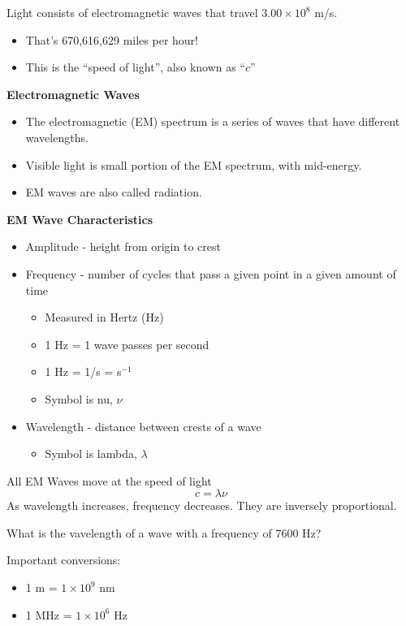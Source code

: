 \documentclass[../hchem.tex]{subfiles}
\begin{document}
Light consists of electromagnetic waves that travel $3.00\times 10^8$ m/s.
\begin{itemize}
    \item That's 670,616,629 miles per hour! 
    \item This is the ``speed of light'', also known as ``$c$''
\end{itemize}

\textbf{Electromagnetic Waves}
\begin{itemize}
    \item The electromagnetic (EM) spectrum is a series of waves that have different wavelengths.
    \item Visible light is small portion of the EM spectrum, with mid-energy.
    \item EM waves are also called radiation.
\end{itemize}

\textbf{EM Wave Characteristics}
\begin{itemize}
    \item Amplitude - height from origin to crest
    \item Frequency - number of cycles that pass a given point in a given amount of time 
    \begin{itemize}
        \item Measured in Hertz (Hz)
        \item 1 Hz = 1 wave passes per second 
        \item 1 Hz = 1/s = s$^{-1}$
        \item Symbol is nu, $\nu$
    \end{itemize}
    \item Wavelength - distance between crests of a wave 
    \begin{itemize}
        \item Symbol is lambda, $\lambda$
    \end{itemize} 
\end{itemize}

All EM Waves move at the speed of light 
\[c=\lambda \nu\]
As wavelength increases, frequency decreases. They are inversely proportional.

\ex What is the vavelength of a wave with a frequency of 7600 Hz?

Important conversions:
\begin{itemize}
    \item 1 m = $1\times10^9$ nm 
    \item 1 MHz = $1\times 10^6$ Hz 
\end{itemize}
\end{document}
